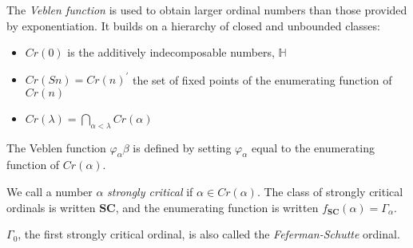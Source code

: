 \documentclass[12pt]{article}
\begin{document}
The \emph{Veblen function} is used to obtain larger ordinal numbers than those provided by exponentiation.  It builds on a hierarchy of closed and unbounded classes:
\begin{itemize}
\item $Cr(0)$ is the additively indecomposable numbers, $\mathbb{H}$
\item $Cr(Sn)=Cr(n)^\prime$ the set of fixed points of the enumerating function of $Cr(n)$
\item $Cr(\lambda)=\bigcap_{\alpha<\lambda} Cr(\alpha)$
\end{itemize}

The Veblen function $\varphi_\alpha\beta$ is defined by setting $\varphi_\alpha$ equal to the enumerating function of $Cr(\alpha)$.

We call a number $\alpha$ \emph{strongly critical} if $\alpha\in Cr(\alpha)$.  The class of strongly critical ordinals is written $\mathbf{SC}$, and the enumerating function is written $f_{\mathbf{SC}}(\alpha)=\Gamma_\alpha$.

$\Gamma_0$, the first strongly critical ordinal, is also called the \emph{Feferman-Schutte} ordinal.
\end{document}
